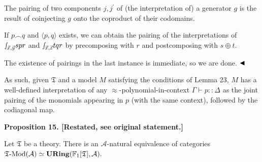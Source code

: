 
 
The pairing of two components $j,j^{\prime}$ of (the interpretation of) a generator $g$ is the result of coinjecting $g$ onto the coproduct of their codomains.\par
 
 
 
If $p\frown q$ and $\langle p,q\rangle$ exists, we can obtain the pairing of the interpretations of ${\smallint\!}_{\vec{x},\vec{y}}spr$ and ${\smallint\!}_{\vec{x},\vec{z}}tqr$ by precomposing with $r$ and postcomposing with $s\oplus t$.\par
 
 
 
The existence of pairings in the last instance is immediate, so we are done. $\hfill\blacktriangleleft$\par
 
 
 
As such, given $\mathfrak{T}$ and a model $M$ satisfying the conditions of Lemma 23, $M$ has a well-defined interpretation of any $\approx$-polynomial-in-context $\Gamma\vdash p::\Delta$ as the joint pairing of the monomials appearing in $p$ (with the same context), followed by the codiagonal map.\par
 
 
 
 
\par\medskip\noindent\textbf{Proposition 15. [Restated, see original statement.]}\par
 
 
Let $\mathfrak{T}$ be a theory. There is an $\mathcal{A}$-natural equivalence of categories $\mathfrak{T}\text{-}\mathrm{Mod}(\mathcal{A})\simeq\mathbf{URing}(\mathbb{F}_{%
1}[\mathfrak{T}],\mathcal{A}).$\par
 
 
 
